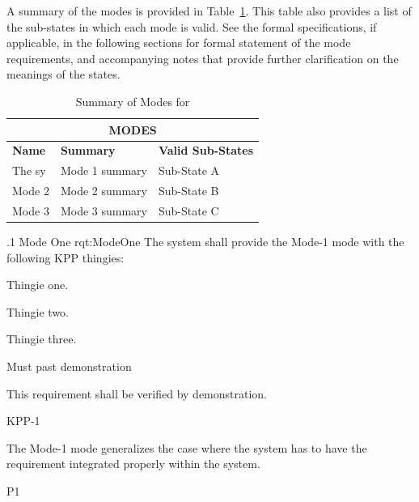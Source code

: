
A summary of the modes is provided in Table~\ref{tab:Modes}.
This table also provides a list of the sub-states in which each mode is valid.
See the formal specifications, if applicable, in the following sections for formal statement of the mode requirements, and accompanying notes that provide further clarification on the meanings of the states.
\begin{table}[htbp]
	\begin{center}
		\begin{tabular}{|p{1.0in}|p{4.0in}|p{1.0in}|}
			\hline
			\hline
			     \multicolumn{3}{|c|}{{\bf MODES}}\\
			\hline
{\bf Name} & {\bf Summary}	& {\bf Valid Sub-States}\\
			\hline
			\hline
The sy & Mode 1 summary & Sub-State A\\ \hline
Mode 2 & Mode 2 summary & Sub-State B\\ \hline
Mode 3 & Mode 3 summary & Sub-State C\\ 
			\hline
			\hline
			\end{tabular}
				\caption{Summary of Modes for \ThisSystem}
				\label{tab:Modes}
		\end{center}
\end{table}


\MULTIRQMTVKPP
{\RqtNumberBase.1}
{Mode One}
{rqt:ModeOne}
{The system shall provide the Mode-1 mode with the following KPP thingies:}
{
	\item Thingie one.
	\item Thingie two.
	\item Thingie three.
}
{
	\item [Phase 1] Must past demonstration
}
{This requirement shall be verified by demonstration.}
{
	\item [\cite{ref__KNEAD_Manual}] KPP-1
}
{
	\item The Mode-1 mode generalizes the case where the system has to have the requirement integrated properly within the system.
}
{P1}


